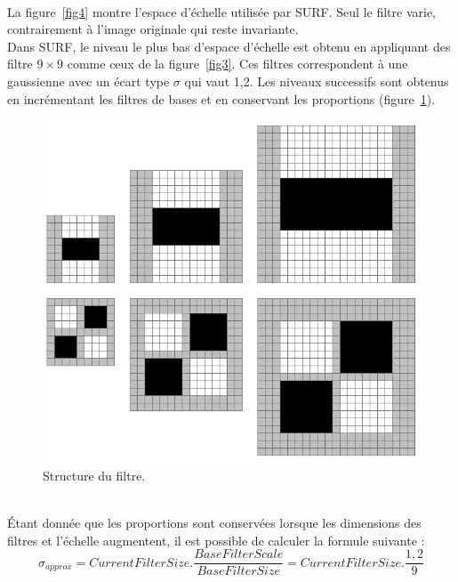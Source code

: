 \documentclass[a4paper,11pt]{report}
\begin{document}
\\La figure~\ref{fig4} montre l'espace d'échelle utilisée par SURF. Seul le filtre varie, contrairement à l'image originale qui reste invariante.
\\ Dans SURF, le niveau le plus bas d'espace d'échelle est obtenu en appliquant des filtre $9\times9$ comme ceux de la figure~\ref{fig3}. Ces filtres correspondent à une gaussienne avec un écart type $\sigma$ qui vaut 1,2. Les niveaux successifs sont obtenus en incrémentant les filtres de bases et en conservant les proportions (figure~\ref{fig5}).
\begin{figure}[ht]
\centering
\includegraphics[scale=0.3]{figure5.png}
\caption{Structure du filtre.}
\label{fig5}
\end{figure}
\\\'Etant donnée que les proportions sont conservées lorsque les dimensions des filtres et l'échelle augmentent, il est possible de  calculer la formule suivante :
$$\sigma_{approx}=CurrentFilterSize.\frac{BaseFilterScale}{BaseFilterSize}=CurrentFilterSize.\frac{1,2}{9}$$
\end{document}
